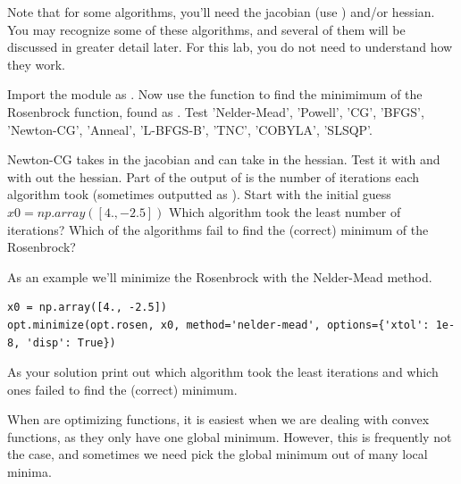 Note that for some algorithms, you'll need the jacobian (use ) and/or hessian.
You may recognize some of these algorithms, and several of them will be discussed in greater detail later. For this lab, you do not need to understand how they work.

\begin{problem}

Import the  module as . Now use the  function to find the minimimum of the Rosenbrock function, found as . Test 'Nelder-Mead', 'Powell', 'CG', 'BFGS', 'Newton-CG', 'Anneal', 'L-BFGS-B', 'TNC', 'COBYLA', 'SLSQP'. 

Newton-CG takes in the jacobian and can take in the hessian. Test it with and with out the hessian. Part of the output of  is the number of iterations each algorithm took (sometimes outputted as ). Start with the initial guess $x0=np.array([4., -2.5])$  Which algorithm took the least number of iterations?  Which of the algorithms fail to find the (correct) minimum of the Rosenbrock?

As an example we'll minimize the Rosenbrock with the Nelder-Mead method.

\begin{lstlisting}
x0 = np.array([4., -2.5])
opt.minimize(opt.rosen, x0, method='nelder-mead', options={'xtol': 1e-8, 'disp': True})
\end{lstlisting}

As your solution print out which algorithm took the least iterations and which ones failed to find the (correct) minimum.

\end{problem}

When are optimizing functions, it is easiest when we are dealing with convex functions, as they only have one global minimum. However, this is frequently not the case, and sometimes we need pick the global minimum out of many local minima.

